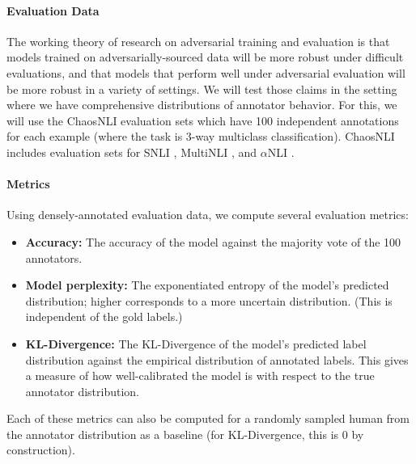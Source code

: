 \documentclass[10pt,a4paper]{article}
\begin{document}
\paragraph{Evaluation Data}
The working theory of research on adversarial training and evaluation is that models trained on
adversarially-sourced data will be more robust under difficult evaluations, and that models that
perform well under adversarial evaluation will be more robust in a variety of settings. We will test
those claims in the setting where we have comprehensive distributions of annotator behavior. For
this, we will use the ChaosNLI evaluation sets \citep{nie-bansal-2020-learn} which have 100
independent annotations for each example (where the task is 3-way multiclass classification).
ChaosNLI includes evaluation sets for SNLI \citep{bowman2015large}, MultiNLI
\citep{williams-etal-2018-broad}, and
$\alpha$NLI \citep[Abductive NLI]{bhagavatula-etal-2020-abductive}.

\paragraph{Metrics}
Using densely-annotated evaluation data, we compute several evaluation metrics:
\begin{itemize}
    \item \textbf{Accuracy:} The accuracy of the model against the majority vote of the 100 annotators.
    \item \textbf{Model perplexity:} The exponentiated entropy of the model's predicted
      distribution; higher corresponds to a more uncertain distribution. (This is independent of the
      gold labels.) 
    \item \textbf{KL-Divergence:} The KL-Divergence of the model's predicted label distribution
      against the empirical distribution of annotated labels. This gives a measure of how
      well-calibrated the model is with respect to the true annotator distribution.
\end{itemize}
Each of these metrics can also be computed for a randomly sampled human from the annotator
distribution as a baseline (for KL-Divergence, this is 0 by construction).
\end{document}
